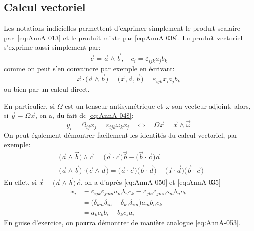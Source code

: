 \subsection{Calcul vectoriel}
Les notations indicielles permettent d'exprimer simplement le produit scalaire par~\eqref{eq:AnnA-013} et le produit mixte par \eqref{eq:AnnA-038}.
Le produit vectoriel s'exprime aussi simplement par:
\begin{equation}
    \vec{c} = \vec{a} \wedge \vec{b}, \quad c_i = \varepsilon_{ijk} a_j b_k
    \label{eq:AnnA-050}
\end{equation}
comme on peut s'en convaincre par exemple en écrivant:
\begin{displaymath}
    \vec{x}\cdot \bigl( \vec{a} \wedge \vec{b} \bigr) = \bigl( \vec{x}, \vec{a}, \vec{b} \bigr) = \varepsilon_{ijk} x_i a_j b_k
\end{displaymath}
ou bien par un calcul direct.

En particulier, si $\mathbb{\Omega}$ est un tenseur antisymétrique et $\vec{\omega}$ son vecteur adjoint, alors, si $\vec{y} = \mathbb{\Omega} \vec{x}$, on a, du fait de \eqref{eq:AnnA-048}:
\begin{equation}
        y_i = \Omega_{ij} x_j = \varepsilon_{ijk} \omega_k x_j \quad\Leftrightarrow\quad
        \mathbb{\Omega} \vec{x} = \vec{x} \wedge \vec{\omega}
    \label{eq:AnnA-051}
\end{equation}
On peut également démontrer facilement les identités du calcul vectoriel, par exemple: 
\begin{equation}
\begin{aligned}
&    \bigl( \vec{a} \wedge \vec{b} \bigr) \wedge \vec{c} = \bigl( \vec{a} \cdot \vec{c}  \bigr) \vec{b} - \bigl( \vec{b} \cdot \vec{c} \bigr) \vec{a}\\
&    \bigl( \vec{a} \wedge \vec{b} \bigr) \cdot \bigl( \vec{c} \wedge \vec{d} \bigr) = \bigl( \vec{a} \cdot \vec{c} \bigr) \bigl( \vec{b} \cdot \vec{d} \bigr) - \bigl(  \vec{a} \cdot \vec{d} \bigr) \bigl( \vec{b} \cdot \vec{c} \bigr)
\end{aligned}
    \label{eq:AnnA-053}
\end{equation}
En effet, si $\vec{x} = \bigl( \vec{a} \wedge \vec{b} \bigr) \vec{c}$, on a d'après \eqref{eq:AnnA-050} et \eqref{eq:AnnA-035}
\begin{align*}
    x_i &= \varepsilon_{ijk} \varepsilon_{jmn} a_m b_n c_k = \varepsilon_{jki} \varepsilon_{jmn} a_m b_n c_k \\
    &= \bigl( \delta_{km} \delta_{in} - \delta_{kn} \delta_{im} \bigr) a_m b_n c_k \\
    &= a_k c_k b_i - b_k c_k a_i
\end{align*}
En guise d'exercice, on pourra démontrer de manière analogue \eqref{eq:AnnA-053}.
